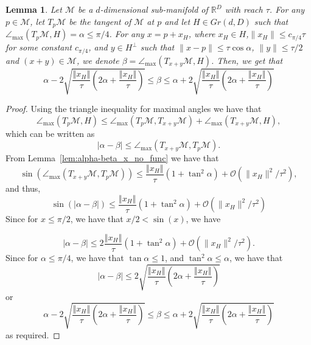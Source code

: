 \documentclass[12pt]{article}
\newtheorem{Lemma}[Theorem]{Lemma}
\theoremstyle{remark}
\newcommand{\RR}{\mathbb{R}}
\newcommand{\MM}{\mathcal{M}}
\newcommand{\OO}{\mathcal{O}}
\newcommand{\norm}[1]{\left\Vert #1 \right\Vert}
\newcommand{\lrbrackets}[1]{\left( #1 \right)}
\newcommand{\maxangle}{\angle_{\max}}
\begin{document}
\begin{appendices}
\begin{Lemma}\label{lem:alpha_beta_x_no_func}
	Let $\MM$ be a $d$-dimensional sub-manifold of $\RR^D$ with reach $\tau$. For any $p \in \MM$, let $T_{p}\MM$ be the tangent of $\MM$ at $p$ and let $ H\in Gr(d, D) $ such that $ \maxangle(T_p\MM, H) = \alpha\leq \pi/4 $.
	For any $x = p + x_H$, where $x_H\in H$,$\|x_H\|\leq c_{\pi/4}\tau$ for some constant $c_{\pi/4}$, and $y\in H^\perp$  such that $\|x-p\|\leq \tau \cos \alpha$, $\|y\| \leq \tau/2$ and $(x + y)\in \MM$, we denote $ \beta = \maxangle(T_{x+y}\MM, H) $.
	Then, we get that
	\[
	\alpha - 2 \sqrt{ \frac{\norm{x_H}}{\tau}\lrbrackets{2 \alpha + \frac{\norm{x_H}}{\tau}} } 
	\leq \beta \leq
	\alpha + 2 \sqrt{ \frac{\norm{x_H}}{\tau}\lrbrackets{2 \alpha + \frac{\norm{x_H}}{\tau}} }
	\]
\end{Lemma}
\begin{proof}
	Using the triangle inequality for maximal angles we have that 
	\[
	\maxangle(T_p \MM, H) \leq \maxangle(T_p \MM,T_{x+y} \MM)+\maxangle(T_{x+y} \MM,H),\]
	which can be written as 
	\[
	|\alpha - \beta| \leq \maxangle(T_{x+y} \MM, T_p \MM)
	.\]
	From Lemma~\ref{lem:alpha-beta_x_no_func} we have that 
	\[
	\sin(\maxangle (T_{x+y}\MM, T_{p}\MM)) \leq \frac{\norm{x_H}}{\tau}(1 + \tan^2 \alpha)  +\OO(\|x_H\|^2/\tau^2)
	,\]
	and thus, 
	\[
	\sin(|\alpha - \beta|) \leq \frac{\norm{x_H}}{\tau}(1 + \tan^2 \alpha)  +\OO(\|x_H\|^2/\tau^2)
	\]
	Since for $x\leq \pi/2$, we have that $x/2<\sin(x)$, we have 
	
	\[
	|\alpha - \beta| \leq 2\frac{\norm{x_H}}{\tau}(1 + \tan^2 \alpha)  +\OO(\|x_H\|^2/\tau^2)
	.\]
	Since for $\alpha \leq \pi/4$, we have that $\tan \alpha \leq 1$, and $\tan^2\alpha \leq \alpha$, we have that 
	\[
	|\alpha - \beta| \leq
	2 \sqrt{ \frac{\norm{x_H}}{\tau}\lrbrackets{2 \alpha + \frac{\norm{x_H}}{\tau}} }
	\]
	or 
	\[
	\alpha - 2 \sqrt{ \frac{\norm{x_H}}{\tau}\lrbrackets{2 \alpha + \frac{\norm{x_H}}{\tau}} } 
	\leq \beta \leq
	\alpha + 2 \sqrt{ \frac{\norm{x_H}}{\tau}\lrbrackets{2 \alpha + \frac{\norm{x_H}}{\tau}} }
	\]
	as required.
\end{proof}




\end{appendices}
\end{document}
